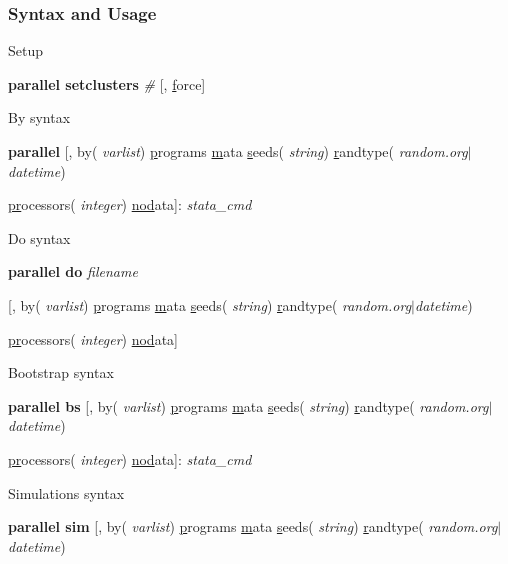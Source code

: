 \documentclass[9pt,\ExtraDocOpts]{beamer}
\begin{document}
\begin{frame}
\frametitle{Syntax and Usage}

Setup

\begin{semiverbatim}
\footnotesize
{\bf parallel setclusters} \textit{\#}  [, \uline{f}orce] 
\end{semiverbatim}\pause{}

By syntax

\begin{semiverbatim}
\footnotesize
{\bf parallel} [, by(\textit{\color{blue} varlist}) \uline{p}rograms \uline{m}ata \uline{s}eeds(\textit{\color{blue} string}) \uline{r}andtype(\textit{\color{blue} random.org$|$datetime})

\hspace{1cm} \uline{pr}ocessors(\textit{\color{blue} integer}) \uline{nod}ata]:  \textit{stata\_cmd}
\end{semiverbatim}\pause{}

Do syntax

\begin{semiverbatim}
\footnotesize
{\bf parallel do} \textit{\color{blue} filename}

\hspace{1cm} [, by(\textit{\color{blue} varlist}) \uline{p}rograms \uline{m}ata \uline{s}eeds(\textit{\color{blue} string}) \uline{r}andtype(\textit{\color{blue} random.org$|$datetime})

\hspace{1cm} \uline{pr}ocessors(\textit{\color{blue} integer}) \uline{nod}ata]
\end{semiverbatim}\pause{}

Bootstrap syntax

\begin{semiverbatim}
	\footnotesize
	{\bf parallel bs} [, by(\textit{\color{blue} varlist}) \uline{p}rograms \uline{m}ata \uline{s}eeds(\textit{\color{blue} string}) \uline{r}andtype(\textit{\color{blue} random.org$|$datetime})
	
	\hspace{1cm} \uline{pr}ocessors(\textit{\color{blue} integer}) \uline{nod}ata]:  \textit{stata\_cmd}
\end{semiverbatim}\pause{}


Simulations syntax

\begin{semiverbatim}
	\footnotesize
	{\bf parallel sim} [, by(\textit{\color{blue} varlist}) \uline{p}rograms \uline{m}ata \uline{s}eeds(\textit{\color{blue} string}) \uline{r}andtype(\textit{\color{blue} random.org$|$datetime})
	

\end{semiverbatim}
\end{frame}
\end{document}
